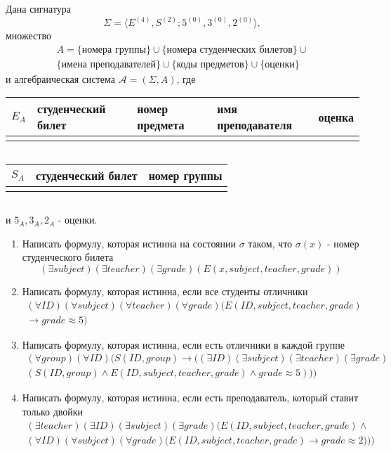 \documentclass[12pt]{article}
\begin{document}
\delimitershortfall=-1pt
Дана сигнатура 
$$\Sigma = \langle E^{(4)},S^{(2)};5^{(0)},3^{(0)},2^{(0)}\rangle,$$ 
множество 
\begin{multline*}
A=\{\text{номера группы}\}\cup\{\text{номера студенческих билетов}\}\cup\\
\{\text{имена преподавателей}\}\cup\{\text{коды предметов}\}\cup\{\text{оценки}\}
\end{multline*}
и алгебраическая система $\mathcal{A}=(\Sigma,A)$, где
\begin{table}[h]
\begin{tabular}{|c|m{3cm}|m{3cm}|m{3cm}|c|}
\hline 
$E_A$ & студенческий билет & номер предмета & имя преподавателя & оценка\\[2ex]
\hline 
 &  &  &  &  \\ 
\hline 
\end{tabular}$\quad$ 
\end{table}
\begin{table}[h]
\begin{tabular}{|c|m{3cm}|c|}
\hline 
$S_A$ & студенческий билет & номер группы \\[2ex]
\hline 
 &  &   \\ 
\hline 
\end{tabular}$\quad$ 
\end{table}

и $5_A, 3_A, 2_A$ - оценки.
\begin{enumerate}
\item Написать формулу, которая истинна на состоянии $\sigma$ таком, что $\sigma(x)$ - номер студенческого билета
$$(\exists subject)(\exists teacher)(\exists grade)(E(x,subject,teacher,grade))$$
\item Написать формулу, которая истинна, если все студенты отличники
\begin{multline*}
(\forall ID)(\forall subject)(\forall teacher)(\forall grade)\big(E(ID,subject,teacher,grade)\\
\to grade\approx 5\big)
\end{multline*}
\item Написать формулу, которая истинна, если есть отличники в каждой группе
\begin{multline*}
(\forall group)(\forall ID)\Big( S(ID,group)\to \big((\exists ID)(\exists subject)(\exists teacher)(\exists grade)\\
(S(ID,group) \wedge E(ID,subject,teacher,grade)\wedge grade\approx 5)\big)\Big)
\end{multline*}
\item Написать формулу, которая истинна, если есть преподаватель, который ставит только двойки
\begin{multline*}
(\exists teacher)(\exists ID)(\exists subject)(\exists grade)\Big(E(ID,subject,teacher,grade)\wedge \\
(\forall ID)(\forall subject)(\forall grade)\big(E(ID,subject,teacher,grade)\to grade\approx 2)\big)\Big)
\end{multline*}
\end{enumerate}
\end{document}
